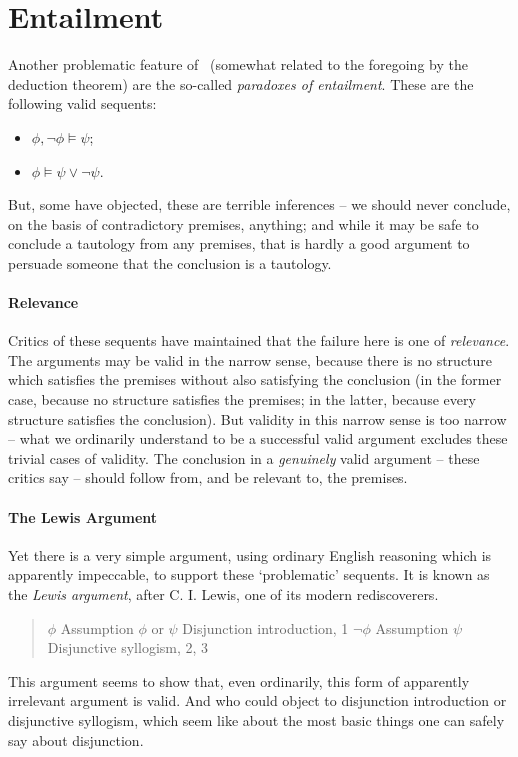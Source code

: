 \section{Entailment}

Another problematic feature of \lone\ (somewhat related to the foregoing by the deduction theorem) are the so-called \emph{paradoxes of entailment}. These are the following valid sequents: \begin{itemize}
	\item $\phi, \neg\phi \vDash \psi$;
	\item $\phi \vDash \psi \vee \neg \psi$.
\end{itemize}
But, some have objected, these are terrible inferences – we should never conclude, on the basis of contradictory premises, anything; and while it may be safe to conclude a tautology from any premises, that is hardly a good argument to persuade someone that the conclusion is a tautology. 

\paragraph{Relevance} Critics of these sequents have maintained that the failure here is one of \emph{relevance}. The arguments may be valid in the narrow sense, because there is no structure which satisfies the premises without also satisfying the conclusion (in the former case, because no structure satisfies the premises; in the latter, because every structure satisfies the conclusion). But validity in this narrow sense is too narrow – what we ordinarily understand to be a successful valid argument excludes these trivial cases of validity. The conclusion in a \emph{genuinely} valid argument – these critics say – should follow from, and be relevant to, the premises.

\paragraph{The Lewis Argument} Yet there is a very simple argument, using ordinary English reasoning which is apparently impeccable, to support these `problematic' sequents. It is known as the \emph{Lewis argument}, after C. I. Lewis, one of its modern rediscoverers. 
\begin{quote}
	\begin{exe}
	\ex $\phi$ \hfill Assumption
	\ex $\phi$ or $\psi$ \hfill Disjunction introduction, 1
	\ex $\neg \phi$ \hfill Assumption 
	\ex $\psi$ \hfill  Disjunctive syllogism, 2, 3
\end{exe}
\end{quote}
This argument seems to show that, even ordinarily, this form of apparently irrelevant argument is valid. And who could object to disjunction introduction or disjunctive syllogism, which seem like about the most basic things one can safely say about disjunction.

